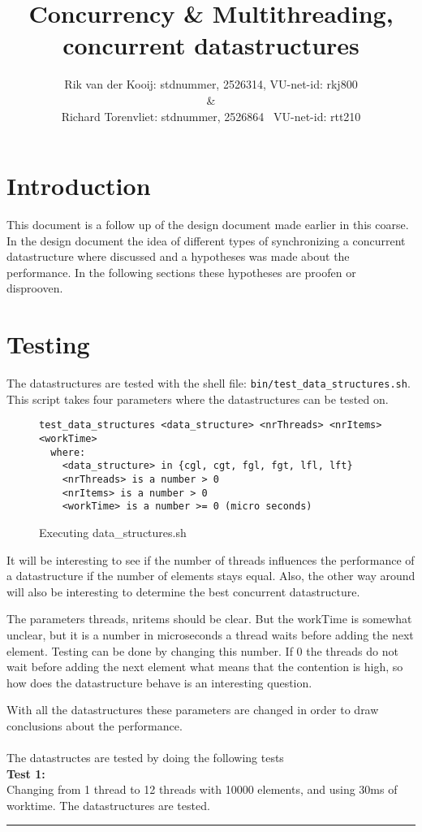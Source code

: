 \documentclass[10pt,a4paper]{article}
\author{Rik van der Kooij: stdnummer, 2526314, VU-net-id: rkj800\\ \&  \\ Richard Torenvliet: stdnummer, 2526864 \ VU-net-id: rtt210}
\title{Concurrency \& Multithreading, concurrent datastructures}
\begin{document}
\maketitle
\tableofcontents

\section{Introduction}
This document is a follow up of the design document made earlier in this coarse. In the design document the idea of different types of synchronizing a concurrent datastructure where discussed and a hypotheses was made about the performance. In the following sections these hypotheses are proofen or disprooven.

\section{Testing}
The datastructures are tested with the shell file: \texttt{bin/test\_data\_structures.sh}. This script takes four parameters where the datastructures can be tested on.

\begin{figure}[h!]
\center
\begin{lstlisting}
test_data_structures <data_structure> <nrThreads> <nrItems> <workTime>
  where:
    <data_structure> in {cgl, cgt, fgl, fgt, lfl, lft}
    <nrThreads> is a number > 0
    <nrItems> is a number > 0
    <workTime> is a number >= 0 (micro seconds)
\end{lstlisting}
\caption{Executing data\_structures.sh}
\end{figure}
It will be interesting to see if the number of threads influences the performance of a datastructure if the number of elements stays equal. Also, the other way around will also be interesting to determine the best concurrent datastructure.

The parameters threads, nritems should be clear. But the workTime is somewhat unclear, but it is a number in microseconds a thread waits before adding the next element. Testing can be done by changing this number. If 0 the threads do not wait before adding the next element what means that the contention is high, so how does the datastructure behave is an interesting question.

With all the datastructures these parameters are changed in order to draw conclusions about the performance. 
\\
\\
The datastructes are tested by doing the following tests \\
\textbf{Test 1:} \\
Changing from 1 thread to 12 threads with 10000 elements, and using 30ms of 
worktime. The datastructures are tested.
\vspace{0.1cm}
\hrule
\vspace{0.1cm}
\end{document}
